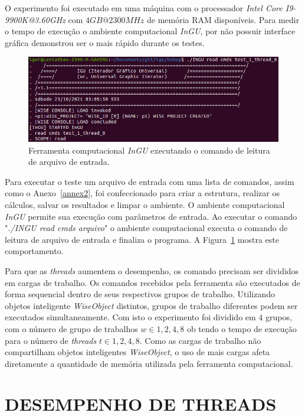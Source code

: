 O experimento foi executado em uma máquina com o processador \textit{Intel Core I9-9900K@3.60GHz} com $4GB@2300MHz$ de memória RAM disponíveis. Para medir o tempo de execução o ambiente computacional \textit{InGU}, por não possuir interface gráfica demonstrou ser o mais rápido durante os testes.


\begin{figure}[!htbp]
	\centering
	\includegraphics[width=\linewidth]{Figures/INGU.png}
	\caption{Ferramenta computacional \textit{InGU} executando o comando de leitura de arquivo de entrada.}
	\label{fig:INGU}
\end{figure}

Para executar o teste um arquivo de entrada com uma lista de comandos, assim como o Anexo~\ref{annex2}, foi confeccionado para criar a estrutura, realizar os cálculos, salvar os resultados e limpar o ambiente. O ambiente computacional \textit{InGU} permite sua execução com parâmetros de entrada. Ao executar o comando "\textit{./INGU read cmds arquivo}" o ambiente computacional executa o comando de leitura de arquivo de entrada e finaliza o programa. A Figura~\ref{fig:INGU} mostra este comportamento.

Para que as \textit{threads} aumentem o desempenho, os comando precisam ser divididos em cargas de trabalho. Os comandos recebidos pela ferramenta são executados de forma sequencial dentro de seus respectivos grupos de trabalho. Utilizando objetos inteligente \textit{WiseObject} distintos, grupos de trabalho diferentes podem ser executados simultaneamente. Com isto o experimento foi dividido em $4$ grupos, com o número de grupo de trabalhos $w \in {1,2,4,8}$ ob tendo o tempo de execução para o número de \textit{threads} $t \in {1,2,4,8}$. Como as cargas de trabalho não compartilham objetos inteligentes \textit{WiseObject}, o uso de mais cargas afeta diretamente a quantidade de memória utilizada pela ferramenta computacional.


\section{DESEMPENHO DE THREADS}\label{sec:cenario4}

